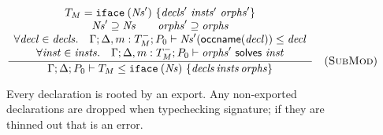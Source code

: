 \begin{figure}


\[
\frac{
\begin{array}{c}
T_M = \texttt{iface}\:(\mathit{Ns}')~\{\mathit{decls}'~\mathit{insts}'~\mathit{orphs}'\} \\
\mathit{Ns}' \supseteq \mathit{Ns} \qquad
\mathit{orphs}' \supseteq \mathit{orphs} \\
\forall \mathit{decl} \in \mathit{decls}.\quad \Gamma; \Delta, m : T_M^-; P_0 \vdash \mathit{Ns}'(\textsf{occname}(\mathit{decl})) \le \mathit{decl} \\
\forall \mathit{inst} \in \mathit{insts}.\quad \Gamma; \Delta, m : T_M^-; P_0 \vdash \mathit{orphs}' ~\textsf{solves}~ \mathit{inst}
\end{array}
}{
\Gamma; \Delta; P_0 \vdash T_M \le \texttt{iface}\:(\mathit{Ns})~\{\mathit{decls}\, \mathit{insts}\, \mathit{orphs}\}
}
\quad(\textsc{SubMod})
\]

\caption{
Every declaration is rooted by an export.  Any non-exported declarations are dropped when typechecking signature; if they are thinned out that is an error.
}
\label{typing:top-subtyping}


\end{figure}


